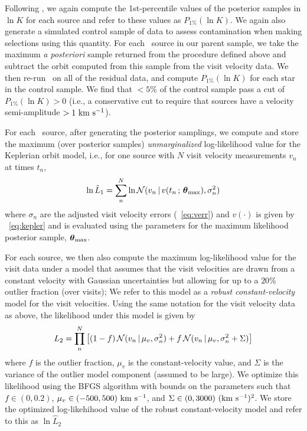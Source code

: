 \documentclass[modern]{aastex63}
\begin{document}
Following \citet{Price-Whelan:2018}, we again compute the 1st-percentile values
of the posterior samples in $\ln K$ for each source and refer to these values as
$P_{1\%}(\ln K)$.
We again also generate a simulated control sample of data to assess
contamination when making selections using this quantity.
For each \apogee\ source in our parent sample, we take the maximum \textsl{a
posteriori} sample returned from the procedure defined above and subtract the
orbit computed from this sample from the visit velocity data.
We then re-run \thejoker\ on all of the residual data, and compute $P_{1\%}(\ln
K)$ for each star in the control sample.
We find that $<5\%$ of the control sample pass a cut of $P_{1\%}(\ln K) > 0$
(i.e., a conservative cut to require that sources have a velocity semi-amplitude
$> 1~\mathrm{km}~\mathrm{s}^{-1}$).

For each \apogee\ source, after generating the posterior samplings, we compute
and store the maximum (over posterior samples) \emph{unmarginalized}
log-likelihood value for the Keplerian orbit model, i.e., for one source with
$N$ visit velocity measurements $v_n$ at times $t_n$,
\begin{equation}
    \ln \hat{L}_1 = \sum_n^N \ln \mathcal{N}(v_n \given
        v(t_n \,;\, \bs{\theta}_{\mathrm{max}}), \sigma_n^2)
\end{equation}
where $\sigma_n$ are the adjusted visit velocity errors
(\equationname~\ref{eq:verr}) and $v(\cdot)$ is given by
\equationname~\ref{eq:kepler} and is evaluated using the parameters for the
maximum likelihood posterior sample, $\boldsymbol{\theta}_{\mathrm{max}}$.

For each source, we then also compute the maximum log-likelihood value for the
visit data under a model that assumes that the visit velocities are drawn from a
constant velocity with Gaussian uncertainties but allowing for up to a $20\%$
outlier fraction (over visits); We refer to this model as a \emph{robust
constant-velocity} model for the visit velocities.
Using the same notation for the visit velocity data as above, the likelihood
under this model is given by
\begin{equation}
    L_2 = \prod_n^N \left[(1-f) \, \mathcal{N}(v_n \given \mu_v, \sigma_n^2)
        + f\, \mathcal{N}(v_n \given \mu_v, \sigma_n^2 + \Sigma) \right]
\end{equation}
where $f$ is the outlier fraction, $\mu_v$ is the constant-velocity value, and
$\Sigma$ is the variance of the outlier model component (assumed to be large).
We optimize this likelihood using the BFGS \citep{BFGS} algorithm with bounds on
the parameters such that $f \in (0, 0.2)$, $\mu_v \in (-500, 500)~\mathrm{km}~\mathrm{s}^{-1}$, and
$\Sigma \in (0, 3000)~(\mathrm{km}~\mathrm{s}^{-1})^2$.
We store the optimized log-likehihood value of the robust constant-velocity
model and refer to this as $\ln \hat{L}_2$
\end{document}
